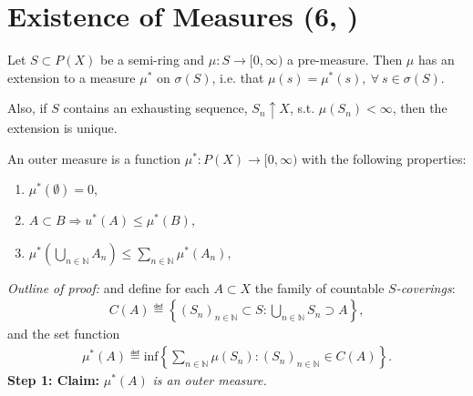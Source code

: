 \section{Existence of Measures \tiny{ (6, \cite{schilling2017measures})}}
\begin{theorem}
    Let \(S\subset P(X)\) be a semi-ring and \(\mu:S\rightarrow[0,\infty)\) a pre-measure. Then \(\mu\) has an extension to a measure \(\mu^{*}\)
    on \(\sigma(S)\), i.e. that \(\mu(s) = \mu^{*}(s), \ \forall \ s\in \sigma(S)\). 
    
    Also, if \(S\) contains an exhausting sequence, \(S_n\uparrow X\), s.t. \(\mu(S_n) < \infty\), then the extension is 
    unique.
\end{theorem}
\begin{definition}
    An outer measure is a function \(\mu^{*}: P(X) \rightarrow [0,\infty)\) with the following properties:
    \begin{enumerate}
        \item \(\mu^{*}(\emptyset) = 0\),
        \item \(A\subset B \Rightarrow u^{*}(A) \leq \mu^{*}(B)\),
        \item \(\mu^{*}\left( \bigcup\limits_{n\in\mathbb{N}} A_n \right)\leq \sum\limits_{n\in\mathbb{N}} \mu^{*}(A_n)\),
    \end{enumerate}
\end{definition}
\ifdetailed
\emph{Outline of proof:} 
and define for each \(A\subset X\) the family of countable \(S\)\emph{-coverings}:
\begin{align*}
    C(A) \eqdef \left\{(S_n)_{n\in\mathbb{N}} \subset S : \bigcup\limits_{n\in\mathbb{N}} S_n\supset A\right\},
\end{align*}
and the set function
\begin{align*}
    \mu^{*}(A) \eqdef \text{inf}\left\{ \sum\limits_{n\in\mathbb{N}} \mu(S_n): (S_n)_{n\in\mathbb{N}}\in C(A)\right\}.
\end{align*}
\textbf{Step 1: Claim: } \(\mu^{*}(A)\)\emph{ is an outer measure.}

